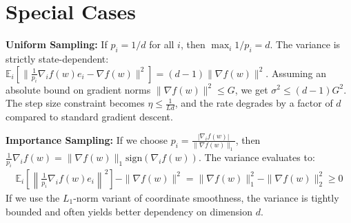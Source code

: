 \documentclass{article}
\begin{document}
\section*{Special Cases}
\textbf{Uniform Sampling:} If $p_i = 1/d$ for all $i$, then $\max_i 1/p_i = d$. The variance is strictly state-dependent: $\mathbb{E}_i[\|\frac{1}{p_i}\nabla_i f(w)e_i - \nabla f(w)\|^2] = (d-1)\|\nabla f(w)\|^2$. Assuming an absolute bound on gradient norms $\|\nabla f(w)\|^2 \leq G$, we get $\sigma^2 \leq (d-1)G^2$. The step size constraint becomes $\eta \leq \frac{1}{Ld}$, and the rate degrades by a factor of $d$ compared to standard gradient descent.

\textbf{Importance Sampling:} If we choose $p_i = \frac{|\nabla_i f(w)|}{\|\nabla f(w)\|_1}$, then $\frac{1}{p_i} \nabla_i f(w) = \|\nabla f(w)\|_1 \text{sign}(\nabla_i f(w))$. The variance evaluates to:
\begin{align*}
\mathbb{E}_i \left[ \left\| \frac{1}{p_i} \nabla_i f(w) e_i \right\|^2 \right] - \|\nabla f(w)\|^2 = \|\nabla f(w)\|_1^2 - \|\nabla f(w)\|_2^2 \geq 0
\end{align*}
If we use the $L_1$-norm variant of coordinate smoothness, the variance is tightly bounded and often yields better dependency on dimension $d$.
\end{document}
